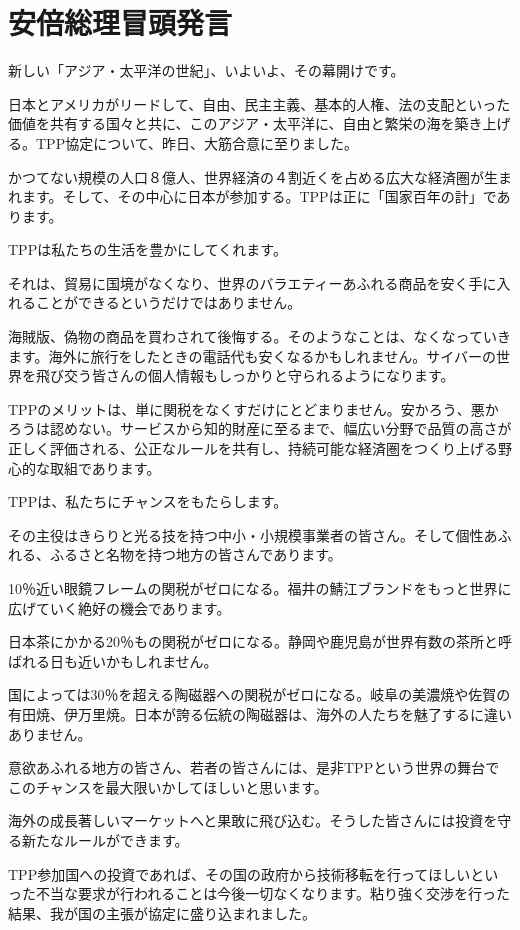 \section {安倍総理冒頭発言}
新しい「アジア・太平洋の世紀」、いよいよ、その幕開けです。\par
日本とアメリカがリードして、自由、民主主義、基本的人権、法の支配といった価値を共有する国々と共に、このアジア・太平洋に、自由と繁栄の海を築き上げる。TPP協定について、昨日、大筋合意に至りました。\par
かつてない規模の人口８億人、世界経済の４割近くを占める広大な経済圏が生まれます。そして、その中心に日本が参加する。TPPは正に「国家百年の計」であります。\par
TPPは私たちの生活を豊かにしてくれます。\par
それは、貿易に国境がなくなり、世界のバラエティーあふれる商品を安く手に入れることができるというだけではありません。\par
海賊版、偽物の商品を買わされて後悔する。そのようなことは、なくなっていきます。海外に旅行をしたときの電話代も安くなるかもしれません。サイバーの世界を飛び交う皆さんの個人情報もしっかりと守られるようになります。\par
TPPのメリットは、単に関税をなくすだけにとどまりません。安かろう、悪かろうは認めない。サービスから知的財産に至るまで、幅広い分野で品質の高さが正しく評価される、公正なルールを共有し、持続可能な経済圏をつくり上げる野心的な取組であります。\par
TPPは、私たちにチャンスをもたらします。\par
その主役はきらりと光る技を持つ中小・小規模事業者の皆さん。そして個性あふれる、ふるさと名物を持つ地方の皆さんであります。\par
10％近い眼鏡フレームの関税がゼロになる。福井の鯖江ブランドをもっと世界に広げていく絶好の機会であります。\par
日本茶にかかる20％もの関税がゼロになる。静岡や鹿児島が世界有数の茶所と呼ばれる日も近いかもしれません。\par
国によっては30％を超える陶磁器への関税がゼロになる。岐阜の美濃焼や佐賀の有田焼、伊万里焼。日本が誇る伝統の陶磁器は、海外の人たちを魅了するに違いありません。\par
意欲あふれる地方の皆さん、若者の皆さんには、是非TPPという世界の舞台でこのチャンスを最大限いかしてほしいと思います。\par
海外の成長著しいマーケットへと果敢に飛び込む。そうした皆さんには投資を守る新たなルールができます。\par
TPP参加国への投資であれば、その国の政府から技術移転を行ってほしいといった不当な要求が行われることは今後一切なくなります。粘り強く交渉を行った結果、我が国の主張が協定に盛り込まれました。\par
